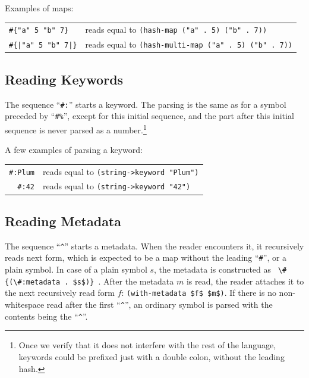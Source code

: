 \example Examples of maps:

\begin{tabular}{ l l }
  \lstinline!#{"a" 5 "b" 7}! & reads equal to \lstinline!(hash-map ("a" . 5) ("b" . 7))! \\
  \lstinline!#{|"a" 5 "b" 7|}! & reads equal to \lstinline!(hash-multi-map ("a" . 5) ("b" . 7))! \\
\end{tabular}





\subsection{Reading Keywords}
\label{subsec:aml-base-lang-reader-keywords}

The sequence ``\lstinline!#:!'' starts a keyword. The parsing is the same as for a symbol preceded by ``\lstinline!#%!'', except for this initial sequence, and the part after this initial sequence is never parsed as a number.\footnote{Once we verify that it does not interfere with the rest of the language, keywords could be prefixed just with a double colon, without the leading hash.}

\example A few examples of parsing a keyword:

\begin{tabular}{ r l }
  \lstinline!#:Plum! & reads equal to \lstinline!(string->keyword "Plum")! \\
  \lstinline!#:42! & reads equal to \lstinline!(string->keyword "42")! \\
\end{tabular}





\subsection{Reading Metadata}
\label{subsec:aml-base-lang-reader-metadata}


The sequence ``\lstinline!^!'' starts a metadata. When the reader encounters it, it recursively reads next form, which is expected to be a map without the leading ``\lstinline!#!'', or a plain symbol. In case of a plain symbol $s$, the metadata is constructed as \lstinline! \#{(\#:metadata . $s$)} !. After the metadata $m$ is read, the reader attaches it to the next recursively read form $f$\thinspace: \lstinline!(with-metadata $f$ $m$)!. If there is no non-whitespace read after the first ``\lstinline!^!'', an ordinary symbol is parsed with the contents being the ``\lstinline!^!''.


